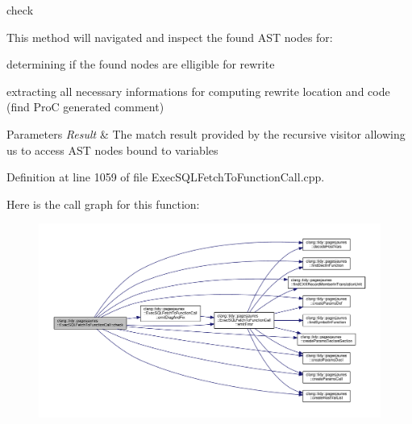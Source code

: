 check

This method will navigated and inspect the found A\+ST nodes for\+:
\begin{DoxyItemize}
\item determining if the found nodes are elligible for rewrite
\item extracting all necessary informations for computing rewrite location and code (find ProC generated comment)
\end{DoxyItemize}


\begin{DoxyParams}{Parameters}
{\em Result} & The match result provided by the recursive visitor allowing us to access A\+ST nodes bound to variables \\
\hline
\end{DoxyParams}


Definition at line 1059 of file Exec\+S\+Q\+L\+Fetch\+To\+Function\+Call.\+cpp.

Here is the call graph for this function\+:
\nopagebreak
\begin{figure}[H]
\begin{center}
\leavevmode
\includegraphics[width=350pt]{classclang_1_1tidy_1_1pagesjaunes_1_1_exec_s_q_l_fetch_to_function_call_ad12827794322cf0b75a4a5ff19db75e2_cgraph}
\end{center}
\end{figure}
\mbox{\label{classclang_1_1tidy_1_1pagesjaunes_1_1_exec_s_q_l_fetch_to_function_call_a4c78d8c38616b4f3cf6f4294f2a22953}} 
